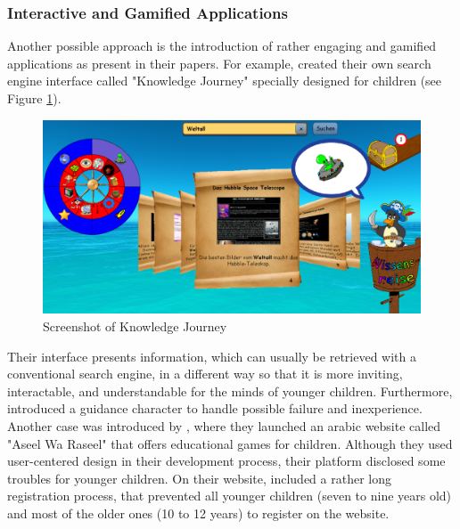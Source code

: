 \subsubsection{Interactive and Gamified Applications}
Another possible approach is the introduction of rather engaging and gamified applications as \textcite{gossen2012search, alhussayen2015evaluating, lozano2016dedigitalizing, gan2015enhancing} present in their papers. For example, \textcite{gossen2012search} created their own search engine interface called "Knowledge Journey" specially designed for children (see Figure \ref{figure:KnowledgeJourney}). 
\begin{figure}[!ht]
    \centering
    \includegraphics[width=1 \linewidth]{images/knowledge_journey.png}
    \caption{
        Screenshot of Knowledge Journey \autocite[60]{gossen2012search}
    }
    \label{figure:KnowledgeJourney}
\end{figure}
Their interface presents information, which can usually be retrieved with a conventional search engine, in a different way so that it is more inviting, interactable, and understandable for the minds of younger children. Furthermore, \textcite{gossen2012search} introduced a guidance character to handle possible failure and inexperience.
Another case was introduced by \textcite{alhussayen2015evaluating}, where they launched an arabic website called "Aseel Wa Raseel" that offers educational games for children. Although they used user-centered design in their development process, their platform disclosed some troubles for younger children. On their website, \textcite{alhussayen2015evaluating} included a rather long registration process, that prevented all younger children (seven to nine years old) and most of the older ones (10 to 12 years) to register on the website. 

